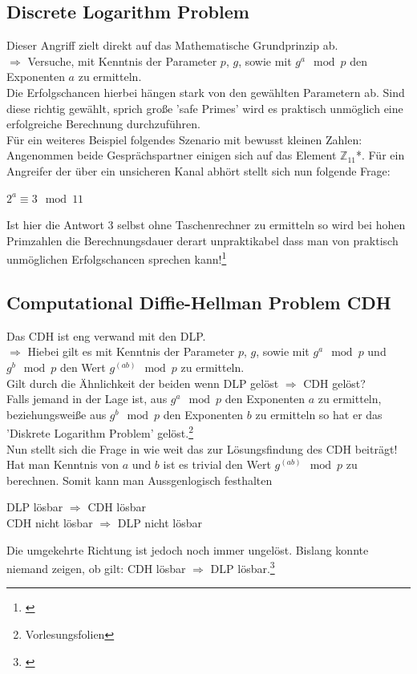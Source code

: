 \documentclass[a4paper,12pt]{scrartcl}
\begin{document}
\newpage
\subsection{Discrete Logarithm Problem}
Dieser Angriff zielt direkt auf das Mathematische Grundprinzip ab.\\
$\Rightarrow$
Versuche, mit Kenntnis der Parameter $p$, $g$, sowie mit $g^a \mod p$ den Exponenten $a$ zu
ermitteln.\\
 Die Erfolgschancen hierbei hängen  stark von den gewählten Parametern ab. Sind diese richtig gewählt, sprich große 'safe Primes' wird es praktisch unmöglich eine erfolgreiche Berechnung durchzuführen.\\
Für ein weiteres Beispiel folgendes Szenario mit bewusst kleinen Zahlen:\\
Angenommen beide Gesprächspartner einigen sich auf das Element $\mathbb{Z}_{11}$*. Für ein Angreifer der über ein unsicheren Kanal abhört stellt sich nun folgende Frage:\\
\begin{center}
 $2^a \equiv 3 \mod 11$
\end{center}
Ist hier die Antwort $3$ selbst ohne Taschenrechner zu ermitteln so wird bei hohen Primzahlen die Berechnungsdauer derart unpraktikabel dass man von praktisch unmöglichen Erfolgschancen sprechen kann!\footnote{\cite{10.1007/11761679_1}}
\\
\newline
\subsection{Computational Diffie-Hellman Problem CDH}
Das CDH ist eng verwand mit den DLP.\\
$\Rightarrow$ Hiebei gilt es mit Kenntnis der Parameter $p$, $g$, sowie mit $g^a \mod p$ und $g^b \mod p$ den Wert $g^(ab) \mod p$ zu ermitteln.\\
Gilt durch die Ähnlichkeit der beiden wenn DLP gelöst $\Rightarrow$ CDH gelöst?\\

Falls jemand in der Lage ist, aus $g^a \mod p$ den Exponenten $a$ zu ermitteln, beziehungsweiße aus $g^b \mod p$ den Exponenten $b$ zu ermitteln so hat er das 'Diskrete Logarithm Problem' gelöst.\footnote{Vorlesungsfolien}\\
Nun stellt sich die Frage in wie weit das zur Lösungsfindung des  CDH beiträgt!\\
Hat man Kenntnis von $a$ und $b$ ist es trivial den Wert $g^(ab) \mod p$ zu berechnen. Somit kann man Aussgenlogisch festhalten
\begin{center}
 DLP lösbar $\Rightarrow$ CDH lösbar\\
 CDH nicht lösbar $\Rightarrow$ DLP nicht lösbar
\end{center}
Die umgekehrte Richtung ist jedoch noch immer ungelöst. Bislang konnte niemand zeigen,
ob gilt: CDH lösbar $\Rightarrow$ DLP lösbar.\footnote{\cite{10.1007/978-3-540-39927-8_28}}
\end{document}
